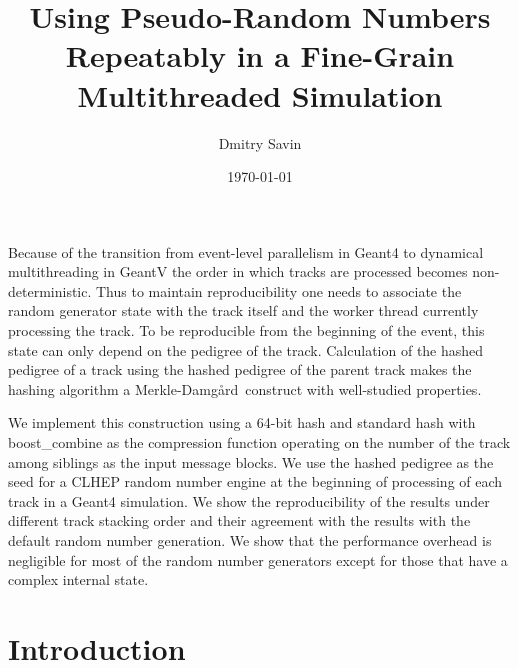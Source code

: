 \documentclass[a4paper, 12pt]{article} %
\title{Using Pseudo-Random Numbers Repeatably in a Fine-Grain Multithreaded Simulation}
\author{Dmitry Savin}
\date{\today}
\newcommand{\MD}{Merkle-Damg\r{a}rd}
\begin{document}
 \maketitle
 
 \abstract
  Because of the transition from event-level parallelism in Geant4 to dynamical multithreading in GeantV the order in which tracks are processed becomes non-deterministic.
  Thus to maintain reproducibility one needs to associate the random generator state with the track itself and the worker thread currently processing the track.
  To be reproducible from the beginning of the event, this state can only depend on the pedigree of the track.
  Calculation of the hashed pedigree of a track using the hashed pedigree of the parent track makes the hashing algorithm a \MD\ construct with well-studied properties.
  
  We implement this construction using a 64-bit hash and standard hash with boost\_combine as the compression function operating on the number of the track among siblings as the input message blocks.
  We use the hashed pedigree as the seed for a CLHEP random number engine at the beginning of processing of each track in a Geant4 simulation.
  We show the reproducibility of the results under different track stacking order and their agreement with the results with the default random number generation.
  We show that the performance overhead is negligible for most of the random number generators except for those that have a complex internal state.
  
 \newpage
 \tableofcontents
 \newpage
  
 \section{Introduction}
%    
%    
   
\end{document}
